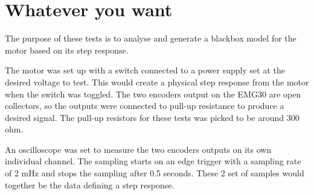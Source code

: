 \section{Whatever you want}

The purpose of these tests is to analyse and generate a blackbox model for the motor based on its step response. 

The motor was set up with a switch connected to a power supply set at the desired voltage to test. This would create a physical step response from the motor when the switch was toggled. The two encoders output on the EMG30 are open collectors, so the outputs were connected to pull-up resistance to produce a desired signal. The pull-up resistors for these tests was picked to be around 300 ohm.

An oscilloscope was set to measure the two encoders outputs on its own individual channel. The sampling starts on an edge trigger with a sampling rate of 2 mHz and stops the sampling after 0.5 seconds.
These 2 set of samples would together be the data defining a step response. 
